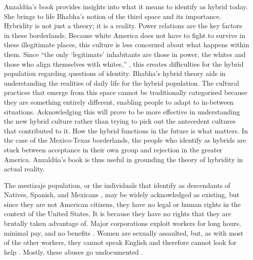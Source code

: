 	Anzaldúa’s book provides insights into what it means to identify as hybrid today. She brings to life Bhabha’s notion of the third space and its importance. Hybridity is not just a theory; it is a reality. Power relations are the key factors in these borderlands. Because white America does not have to fight to survive in these illegitimate places, this culture is less concerned about what happens within them. Since “the only ‘legitimate’ inhabitants are those in power, the whites and those who align themselves with whites,” \parencite [3-4] {Anzaldua_1987}, this creates difficulties for the hybrid population regarding questions of identity. Bhabha’s hybrid theory aids in understanding the realities of daily life for the hybrid population. The cultural practices that emerge from this space cannot be traditionally categorised because they are something entirely different, enabling people to adapt to in-between situations. Acknowledging this will prove to be more effective in understanding the new hybrid culture rather than trying to pick out the antecedent cultures that contributed to it. How the hybrid functions in the future is what matters. In the case of the Mexico-Texas borderlands, the people who identify as hybrids are stuck between acceptance in their own group and rejection in the greater America. Anzaldúa’s book is thus useful in grounding the theory of hybridity in actual reality.
	
	The mestizaje population, or the individuals that identify as descendants of Natives, Spanish, and Mexicans \parencite [5] {Anzaldua_1987}, may be widely acknowledged as existing, but since they are not American citizens, they have no legal or human rights in the context of the United States. It is because they have no rights that they are brutally taken advantage of. Major corporations exploit workers for long hours, minimal pay, and no benefits \parencite [12] {Anzaldua_1987}. Women are sexually assaulted, but, as with most of the other workers, they cannot speak English and therefore cannot look for help \parencite{Anzaldua_1987}. Mostly, these abuses go undocumented \parencite  {Anzaldua_1987}.
	
